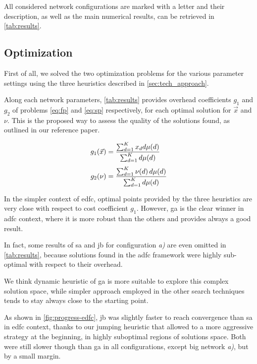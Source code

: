 \documentclass[12pt,journal,draftclsnofoot,onecolumn]{IEEEtran}
\begin{document}
All considered network configurations are marked with a letter and their description, as well as the main numerical results, can be retrieved in \autoref{tab:results}.

\subsection{Optimization}
First of all, we solved the two optimization problems for the various parameter settings using the three heuristics described in \autoref{sec:tech_approach}.

Along each network parameters, \autoref{tab:results} provides overhead coefficients $g_1$ and $g_2$ of problems \autoref{eq:fp} and \autoref{eq:sp} respectively, for each optimal solution for $\vec{x}$ and $\nu$.
This is the proposed way to assess the quality of the solutions found, as outlined in our reference paper.\cite{Lin2007}

\begin{equation*}
	\openup 1\jot %
	\begin{split}
		g_1(\vec{x}) &= \frac{\sum_{d=1}^K x_d d \mu (d)}{\sum_{d=1}^K d \mu (d)} \\
		g_2(\nu) &= \frac{\sum_{d=1}^K \nu(d) \, d \mu (d)}{\sum_{d=1}^K d \mu (d)}
	\end{split}
\end{equation*} \vspace{0cm}

In the simpler context of \gls{edfc}, optimal points provided by the three heuristics are very close with respect to cost coefficient $g_1$.
However, \gls{ga} is the clear  winner in \gls{adfc} context, where it is more robust than the others and provides always a good result.

In fact, some results of \gls{sa} and \gls{jb} for configuration \emph{a)} are even omitted in \autoref{tab:results}, because solutions found in the \gls{adfc} framework were highly sub-optimal with respect to their overhead.

We think dynamic heuristic of \gls{ga} is more suitable to explore this complex solution space, while simpler approach employed in the other search techniques tends to stay always close to the starting point.

\bigbreak
As shown in \autoref{fig:progress-edfc}, \gls{jb} was slightly faster to reach convergence than \gls{sa} in \gls{edfc} context, thanks to our jumping heuristic that allowed to a more aggressive strategy at the beginning, in highly suboptimal regions of solutions space.
Both were still slower though than \gls{ga} in all configurations, except big network \emph{a)}, but by a small margin.
\end{document}
